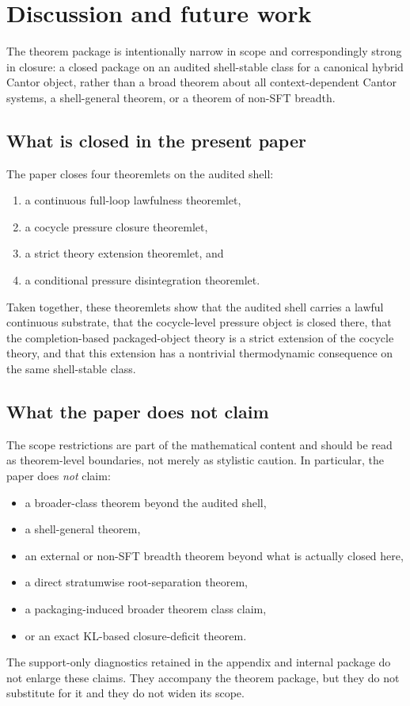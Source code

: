 \section{Discussion and future work}\label{sec:discussion}

The theorem package is intentionally narrow in scope and correspondingly strong in closure: a closed package on an audited shell-stable class for a canonical hybrid Cantor object, rather than a broad theorem about all context-dependent Cantor systems, a shell-general theorem, or a theorem of non-SFT breadth.

\subsection{What is closed in the present paper}

The paper closes four theoremlets on the audited shell:
\begin{enumerate}
    \item a continuous full-loop lawfulness theoremlet,
    \item a cocycle pressure closure theoremlet,
    \item a strict theory extension theoremlet, and
    \item a conditional pressure disintegration theoremlet.
\end{enumerate}
Taken together, these theoremlets show that the audited shell carries a lawful continuous substrate, that the cocycle-level pressure object is closed there, that the completion-based packaged-object theory is a strict extension of the cocycle theory, and that this extension has a nontrivial thermodynamic consequence on the same shell-stable class.

\subsection{What the paper does not claim}

The scope restrictions are part of the mathematical content and should be read as theorem-level boundaries, not merely as stylistic caution. In particular, the paper does \emph{not} claim:
\begin{itemize}
    \item a broader-class theorem beyond the audited shell,
    \item a shell-general theorem,
    \item an external or non-SFT breadth theorem beyond what is actually closed here,
    \item a direct stratumwise root-separation theorem,
    \item a packaging-induced broader theorem class claim,
    \item or an exact KL-based closure-deficit theorem.
\end{itemize}
The support-only diagnostics retained in the appendix and internal package do not enlarge these claims. They accompany the theorem package, but they do not substitute for it and they do not widen its scope.

